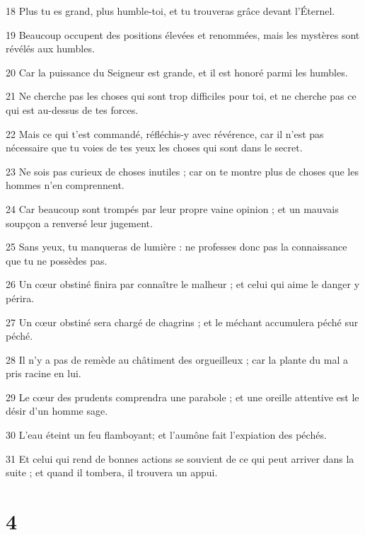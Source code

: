 \par 18 Plus tu es grand, plus humble-toi, et tu trouveras grâce devant l'Éternel.
\par 19 Beaucoup occupent des positions élevées et renommées, mais les mystères sont révélés aux humbles.
\par 20 Car la puissance du Seigneur est grande, et il est honoré parmi les humbles.
\par 21 Ne cherche pas les choses qui sont trop difficiles pour toi, et ne cherche pas ce qui est au-dessus de tes forces.
\par 22 Mais ce qui t'est commandé, réfléchis-y avec révérence, car il n'est pas nécessaire que tu voies de tes yeux les choses qui sont dans le secret.
\par 23 Ne sois pas curieux de choses inutiles ; car on te montre plus de choses que les hommes n'en comprennent.
\par 24 Car beaucoup sont trompés par leur propre vaine opinion ; et un mauvais soupçon a renversé leur jugement.
\par 25 Sans yeux, tu manqueras de lumière : ne professes donc pas la connaissance que tu ne possèdes pas.
\par 26 Un cœur obstiné finira par connaître le malheur ; et celui qui aime le danger y périra.
\par 27 Un cœur obstiné sera chargé de chagrins ; et le méchant accumulera péché sur péché.
\par 28 Il n'y a pas de remède au châtiment des orgueilleux ; car la plante du mal a pris racine en lui.
\par 29 Le cœur des prudents comprendra une parabole ; et une oreille attentive est le désir d'un homme sage.
\par 30 L'eau éteint un feu flamboyant; et l'aumône fait l'expiation des péchés.
\par 31 Et celui qui rend de bonnes actions se souvient de ce qui peut arriver dans la suite ; et quand il tombera, il trouvera un appui.

\chapter{4}


